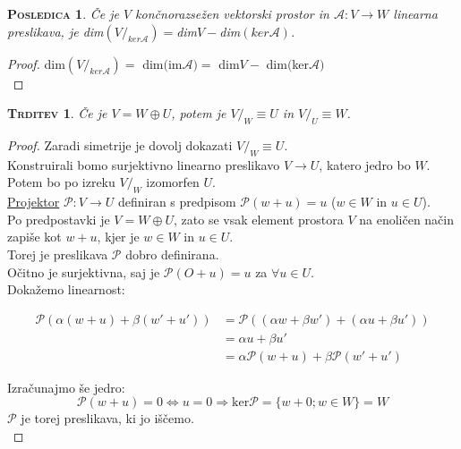 \documentclass[a4paper,12pt]{article}
\newcommand{\A}{\mathcal{A}}
\newtheorem*{trditev}{\textsc{Trditev}}
\newtheorem*{posledica}{\textsc{Posledica}}
\begin{document}
\begin{posledica}
	Če je $V$ končnorazsežen vektorski prostor in $\A :V\to W$ linearna preslikava, je dim$(V/_{ker \A })=$dim$V-$dim$(ker \A)$.\\
\end{posledica}

\begin{proof}
	dim$(V/_{ker \A })=$ dim$($im$\A)=$ dim$V-$ dim$($ker$\A)$ \\
\end{proof}

\begin{trditev}
	Če je $V=W\oplus U$, potem je $V/_W \equiv U$ in $V/_U \equiv W$.\\
\end{trditev}

\begin{proof}
	Zaradi simetrije je dovolj dokazati $V/_W \equiv U$. \\

	Konstruirali bomo surjektivno linearno preslikavo $V\to U$, katero jedro bo $W$. \\

	Potem bo po izreku $V/_W$ izomorfen $U$. \\

	\underline{Projektor} $\mathcal{P}:V\to U$ definiran s predpisom $\mathcal{P}(w+u)=u$ ($w\in W$ in $u\in U$). \\

	Po predpostavki je $V=W\oplus U$, zato se vsak element prostora $V$ na enoličen način zapiše kot $w+u$, kjer je $w\in W$ in $u\in U$. \\

	Torej je preslikava $\mathcal{P}$ dobro definirana. \\

	Očitno je surjektivna, saj je $\mathcal{P}(O+u)=u$ za $\forall u\in U$. \\

	Dokažemo linearnost: 

	\begin{align*}
		\mathcal{P}(\alpha(w+u)+\beta(w'+u'))&=\mathcal{P}((\alpha w + \beta w')+(\alpha u+\beta u')) \\
		&= \alpha u + \beta u' \\
		&= \alpha \mathcal{P}(w+u)+\beta \mathcal{P}(w'+u')
	\end{align*}

	Izračunajmo še jedro:
	\begin{equation*}
		\mathcal{P}(w+u)=0 \Leftrightarrow u=0 \Rightarrow \text{ker}\mathcal{P}=\{w+0;w\in W\}=W
	\end{equation*}
	$\mathcal{P}$ je torej preslikava, ki jo iščemo.\\
\end{proof}
\end{document}
